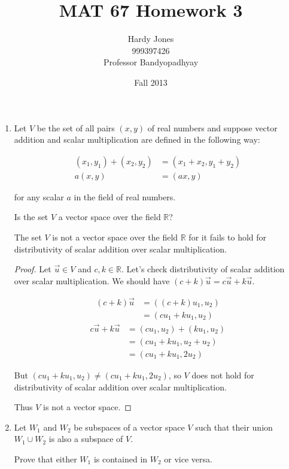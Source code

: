 \documentclass[12pt,letterpaper]{article}
\title{MAT 67 Homework 3\vspace{-2ex}}
\author{Hardy Jones\\
        999397426\\
        Professor Bandyopadhyay\vspace{-2ex}}
\date{Fall 2013}
\begin{document}
  \maketitle

  \begin{enumerate}
    \item
      Let $V$ be the set of all pairs $(x,y)$ of real numbers and suppose vector addition and scalar multiplication are defined in the following way:

      \begin{align*}
        (x_1,y_1) + (x_2,y_2) &= (x_1 + x_2, y_1 + y_2) \\
        a(x,y) &= (ax,y)
      \end{align*}

      for any scalar $a$ in the field of real numbers.

      Is the set $V$ a vector space over the field $\mathbb{R}$?

      The set $V$ is not a vector space over the field $\mathbb{R}$ for it fails to hold for distributivity of scalar addition over scalar multiplication.

      \begin{proof}

        Let $\vec{u} \in V$ and $ c, k \in \mathbb{R}$.  Let's check distributivity of scalar addition over scalar multiplication.  We should have $(c + k)\vec{u} = c\vec{u} + k\vec{u}$.

        \begin{align*}
          (c + k)\vec{u} &= ((c + k)u_1, u_2) \\
          &= (cu_1 + ku_1, u_2)
        \end{align*}
        \begin{align*}
          c\vec{u} + k\vec{u} &= (cu_1, u_2) + (ku_1, u_2) \\
          &= (cu_1 + ku_1, u_2 + u_2) \\
          &= (cu_1 + ku_1, 2u_2)
        \end{align*}

        But $(cu_1 + ku_1, u_2) \neq (cu_1 + ku_1, 2u_2)$,
        so $V$ does not hold for distributivity of scalar addition over scalar multiplication.

        Thus $V$ is not a vector space.
      \end{proof}

    \item
      Let $W_1$ and $W_2$ be subspaces of a vector space $V$ such that their union $W_1 \cup W_2$ is also a subspace of $V$.

      Prove that either $W_1$ is contained in $W_2$ or vice versa.
  \end{enumerate}
\end{document}
